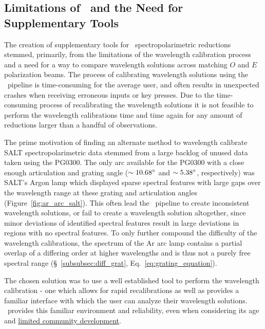 
\subsection{Limitations of \polsalt\ and the Need for Supplementary Tools} \label{subsec:polsalt_limits}

The creation of supplementary tools for \polsalt\ spectropolarimetric reductions stemmed, primarily, from the limitations of the wavelength calibration process and a need for a way to compare wavelength solutions across matching $O$ and $E$ polarization beams. The process of calibrating wavelength solutions using the \polsalt\ pipeline is time-consuming for the average user, and often results in unexpected crashes when receiving erroneous inputs or key presses. Due to the time-consuming process of recalibrating the wavelength solutions it is not feasible to perform the wavelength calibrations time and time again for any amount of reductions larger than a handful of observations.

The prime motivation of finding an alternate method to wavelength calibrate \gls{SALT} spectropolarimetric data stemmed from a large backlog of unused data taken using the PG$0300$. The only arc available for the PG$0300$ with a close enough articulation and grating angle ($\sim 10.68\hbox{$^\circ$}$ and $\sim 5.38\hbox{$^\circ$}$, respectively) was \gls{SALT}'s Argon lamp which displayed sparse spectral features with large gaps over the wavelength range at these grating and articulation angles (Figure~\ref{fig:ar_arc_salt}). This often lead the \polsalt\ pipeline to create inconsistent wavelength solutions, or fail to create a wavelength solution altogether, since minor deviations of identified spectral features result in large deviations in regions with no spectral features. To only further compound the difficulty of the wavelength calibrations, the spectrum of the Ar arc lamp contains a partial overlap of a differing order at higher wavelengths and is thus not a purely free spectral range (\S~\ref{subsubsec:diff_grat}, Eq.~\ref{eq:grating_equation}).

The chosen solution was to use a well established tool to perform the wavelength calibration - one which allows for rapid recalibrations as well as provides a familiar interface with which the user can analyze their wavelength solutions. \iraf\ provides this familiar environment and reliability, even when considering its age and \href{https://github.com/iraf-community/iraf}{limited community development}.

